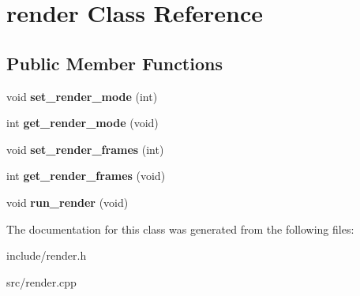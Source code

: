 \hypertarget{classrender}{}\section{render Class Reference}
\label{classrender}
\subsection*{Public Member Functions}
\begin{DoxyCompactItemize}
\item 
\mbox{\label{classrender_a57f6475d3e11334afcec4b724b3a746a}} 
void {\bfseries set\+\_\+render\+\_\+mode} (int)
\item 
\mbox{\label{classrender_ae8aaaf8468b231a1a80eb9c5f36426cd}} 
int {\bfseries get\+\_\+render\+\_\+mode} (void)
\item 
\mbox{\label{classrender_af54c64b6812b29be0d7110a971b13fb1}} 
void {\bfseries set\+\_\+render\+\_\+frames} (int)
\item 
\mbox{\label{classrender_a3bf3a1d51acfd38ada4ae8c4acae05e5}} 
int {\bfseries get\+\_\+render\+\_\+frames} (void)
\item 
\mbox{\label{classrender_a7469c8caa957bcf3dca4eec96c1bcb7c}} 
void {\bfseries run\+\_\+render} (void)
\end{DoxyCompactItemize}


The documentation for this class was generated from the following files\+:\begin{DoxyCompactItemize}
\item 
include/render.\+h\item 
src/render.\+cpp\end{DoxyCompactItemize}
